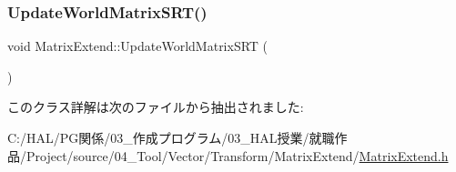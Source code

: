 \mbox{\label{class_matrix_extend_a4c92a6d037b00bc2514064e00323c5dd}} 
\subsubsection{\texorpdfstring{Update\+World\+Matrix\+S\+R\+T()}{UpdateWorldMatrixSRT()}}
{\footnotesize\ttfamily void Matrix\+Extend\+::\+Update\+World\+Matrix\+S\+RT (\begin{DoxyParamCaption}{ }\end{DoxyParamCaption})\hspace{0.3cm}{\ttfamily [inline]}}



このクラス詳解は次のファイルから抽出されました\+:\begin{DoxyCompactItemize}
\item 
C\+:/\+H\+A\+L/\+P\+G関係/03\+\_\+作成プログラム/03\+\_\+\+H\+A\+L授業/就職作品/\+Project/source/04\+\_\+\+Tool/\+Vector/\+Transform/\+Matrix\+Extend/\mbox{\hyperlink{_matrix_extend_8h}{Matrix\+Extend.\+h}}\end{DoxyCompactItemize}
